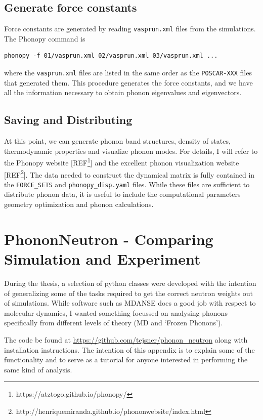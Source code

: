 \section{Generate force constants}
Force constants are generated by reading \texttt{vasprun.xml} files from the simulations. The Phonopy command is
\begin{lstlisting}
phonopy -f 01/vasprun.xml 02/vasprun.xml 03/vasprun.xml ...
\end{lstlisting}

\noindent where the \texttt{vasprun.xml} files are listed in the same order as the \texttt{POSCAR-XXX} files that generated them. This procedure generates the force constants, and we have all the information necessary to obtain phonon eigenvalues and eigenvectors.

\section{Saving and Distributing}
At this point, we can generate phonon band structures, density of states, thermodynamic properties and visualize phonon modes. For details, I will refer to the Phonopy website [REF\footnote{https://atztogo.github.io/phonopy/}] and the excellent phonon visualization website [REF\footnote{http://henriquemiranda.github.io/phononwebsite/index.html}]. The data needed to construct the dynamical matrix is fully contained in the \texttt{FORCE\_SETS} and \texttt{phonopy\_disp.yaml} files. While these files are sufficient to distribute phonon data, it is useful to include the computational parameters geometry optimization and phonon calculations.

\chapter{PhononNeutron - Comparing Simulation and Experiment}\label{app:software}
During the thesis, a selection of python classes were developed with the intention of generalizing some of the tasks required to get the correct neutron weights out of simulations. While software such as MDANSE does a good job with respect to molecular dynamics, I wanted something focussed on analysing phonons specifically from different levels of theory (MD and `Frozen Phonons').

The code be found at \url{https://github.com/tejsner/phonon_neutron} along with installation instructions. The intention of this appendix is to explain some of the functionality and to serve as a tutorial for anyone interested in performing the same kind of analysis.


